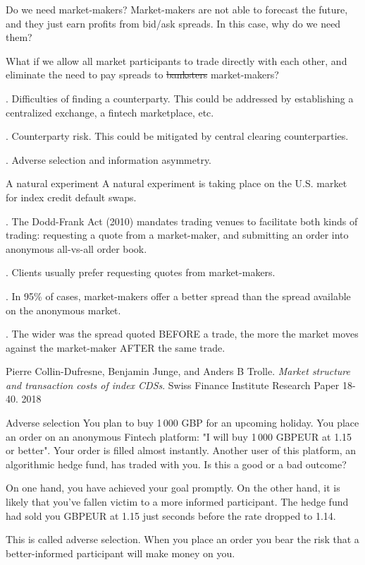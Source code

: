 \documentclass{beamer}
\begin{document}
\begin{frame}{Do we need market-makers?}
\justify
Market-makers are not able to forecast the future, and they just earn profits from bid/ask spreads. In this case, why do we need them?

\justify
What if we allow all market participants to trade directly with each other, and eliminate the need to pay spreads to \sout{banksters} market-makers?

. Difficulties of finding a counterparty. This could be addressed by establishing a centralized exchange, a fintech marketplace, etc.

. Counterparty risk. This could be mitigated by central clearing counterparties.

. Adverse selection and information asymmetry.
\end{frame}



\begin{frame}{A natural experiment}
\justify
A natural experiment is taking place on the U.S. market for index credit default swaps.

. The Dodd-Frank Act (2010) mandates trading venues to facilitate both kinds of trading: requesting a quote from a market-maker, and submitting an order into anonymous all-vs-all order book.

. Clients usually prefer requesting quotes from market-makers.

. In 95\% of cases, market-makers offer a better spread than the spread available on the anonymous market.

. The wider was the spread quoted BEFORE a trade, the more the market moves against the market-maker AFTER the same trade.

\justify
\small{Pierre Collin-Dufresne, Benjamin Junge, and Anders B Trolle. \textit{Market structure and transaction costs of index CDSs}. Swiss Finance Institute Research Paper 18-40. 2018}
\end{frame}


\begin{frame}{Adverse selection}
\justify
You plan to buy 1\,000 GBP for an upcoming holiday. You place an order on an anonymous Fintech platform: "I will buy 1\,000 GBPEUR at 1.15 or better". Your order is filled almost instantly. Another user of this platform, an algorithmic hedge fund, has traded with you. Is this a good or a bad outcome?

\justify
On one hand, you have achieved your goal promptly. On the other hand, it is likely that you've fallen victim to a more informed participant. The hedge fund had sold you GBPEUR at 1.15 just seconds before the rate dropped to 1.14.

\justify
This is called \alert{adverse selection}. When you place an order you bear the risk that a better-informed participant will make money on you.
\end{frame}
\end{document}
